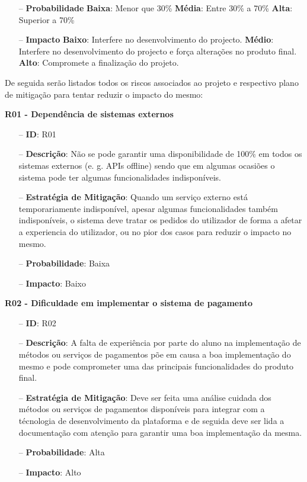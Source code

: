 \begin{itemize}
	\item[--] \textbf{Probabilidade}
		\subitem \textbf{Baixa}: Menor que 30\%
		\subitem \textbf{Média}: Entre 30\% a 70\%
		\subitem \textbf{Alta}: Superior a 70\%
	\item[--] \textbf{Impacto}
		\subitem \textbf{Baixo}: Interfere no desenvolvimento do projecto.
		\subitem \textbf{Médio}: Interfere no desenvolvimento do projecto e força alterações no produto final.
		\subitem \textbf{Alto}: Compromete a finalização do projeto.
\end{itemize}

De seguida serão listados todos os riscos associados ao projeto e respectivo plano de mitigação para tentar reduzir o impacto do mesmo:

\textbf{R01 - Dependência de sistemas externos}
\begin{itemize}
	\item[--] \textbf{ID}: R01
	\item[--] \textbf{Descrição}: Não se pode garantir uma disponibilidade de 100\% em todos os sistemas externos (e. g. APIs offline) sendo que em algumas ocasiões o sistema pode ter algumas funcionalidades indisponíveis.
	\item[--] \textbf{Estratégia de Mitigação}: Quando um serviço externo está temporariamente indisponível, apesar algumas funcionalidades também indisponíveis, o sistema deve tratar os pedidos do utilizador de forma a afetar a experiencia do utilizador, ou no pior dos casos para reduzir o impacto no mesmo.
	\item[--] \textbf{Probabilidade}: Baixa
	\item[--] \textbf{Impacto}: Baixo
\end{itemize}

\textbf{R02 - Dificuldade em implementar o sistema de pagamento}
\begin{itemize}
	\item[--] \textbf{ID}: R02
	\item[--] \textbf{Descrição}: A falta de experiência por parte do aluno na implementação de métodos ou serviços de pagamentos põe em causa a boa implementação do mesmo e pode comprometer uma das principais funcionalidades do produto final.
	\item[--] \textbf{Estratégia de Mitigação}: Deve ser feita uma análise cuidada dos métodos ou serviços de pagamentos disponíveis para integrar com a técnologia de desenvolvimento da plataforma e de seguida deve ser lida a documentação com atenção para garantir uma boa implementação da mesma.
	\item[--] \textbf{Probabilidade}: Alta
	\item[--] \textbf{Impacto}: Alto
\end{itemize}

